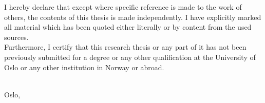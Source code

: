 \begin{declaration}
\noindent
I hereby declare that except where specific reference is made to the work of others, the contents of this thesis is made independently. I have explicitly marked all material which has been quoted either literally or by content from the used sources.
\\
\noindent
Furthermore, I certify that this research thesis or any part of it has not been previously submitted for a degree or any other qualification at the University of Oslo or any other institution in Norway or abroad.

\begin{flushright}
	\Author \\
	Oslo, \Date
\end{flushright}


\end{declaration}


